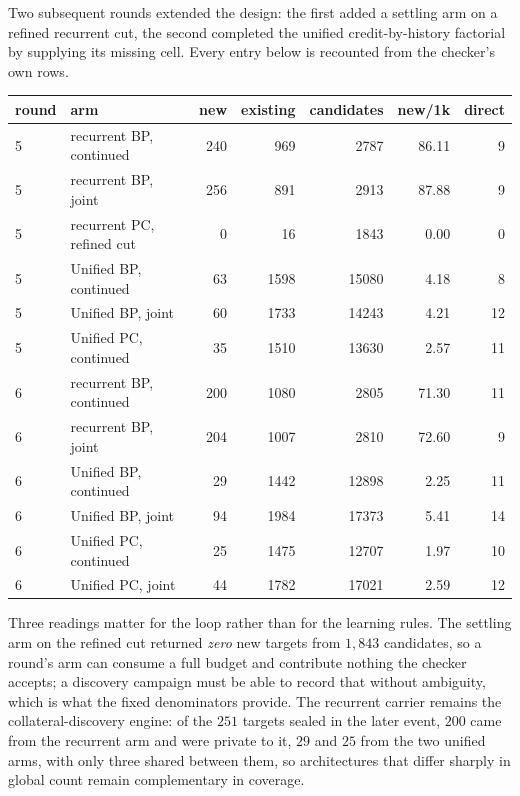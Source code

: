\documentclass[11pt]{article}
\begin{document}
Two subsequent rounds extended the design: the first added a settling arm on a refined
recurrent cut, the second completed the unified credit-by-history factorial by supplying
its missing cell. Every entry below is recounted from the checker's own rows.

\begin{center}\small
\begin{tabular}{@{}llrrrrr@{}}
\toprule
round & arm & new & existing & candidates & new/1k & direct \\
\midrule
5 & recurrent BP, continued & 240 & 969 & 2787 & 86.11 & 9 \\
5 & recurrent BP, joint & 256 & 891 & 2913 & 87.88 & 9 \\
5 & recurrent PC, refined cut & 0 & 16 & 1843 & 0.00 & 0 \\
5 & Unified BP, continued & 63 & 1598 & 15080 & 4.18 & 8 \\
5 & Unified BP, joint & 60 & 1733 & 14243 & 4.21 & 12 \\
5 & Unified PC, continued & 35 & 1510 & 13630 & 2.57 & 11 \\
\midrule
6 & recurrent BP, continued & 200 & 1080 & 2805 & 71.30 & 11 \\
6 & recurrent BP, joint & 204 & 1007 & 2810 & 72.60 & 9 \\
6 & Unified BP, continued & 29 & 1442 & 12898 & 2.25 & 11 \\
6 & Unified BP, joint & 94 & 1984 & 17373 & 5.41 & 14 \\
6 & Unified PC, continued & 25 & 1475 & 12707 & 1.97 & 10 \\
6 & Unified PC, joint & 44 & 1782 & 17021 & 2.59 & 12 \\
\bottomrule
\end{tabular}
\end{center}

Three readings matter for the loop rather than for the learning rules. The settling arm on
the refined cut returned \emph{zero} new targets from $1{,}843$ candidates, so a round's
arm can consume a full budget and contribute nothing the checker accepts; a discovery
campaign must be able to record that without ambiguity, which is what the fixed
denominators provide. The recurrent carrier remains the collateral-discovery engine: of
the $251$ targets sealed in the later event, $200$ came from the recurrent arm and were
private to it, $29$ and $25$ from the two unified arms, with only three shared between
them, so architectures that differ sharply in global count remain complementary in
coverage.
\end{document}
